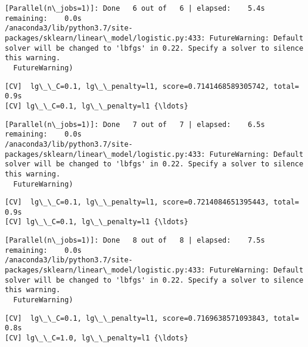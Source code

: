 \documentclass[11pt]{article}
\begin{document}
    \begin{Verbatim}[commandchars=\\\{\}]
[Parallel(n\_jobs=1)]: Done   6 out of   6 | elapsed:    5.4s remaining:    0.0s
/anaconda3/lib/python3.7/site-packages/sklearn/linear\_model/logistic.py:433: FutureWarning: Default solver will be changed to 'lbfgs' in 0.22. Specify a solver to silence this warning.
  FutureWarning)

    \end{Verbatim}

    \begin{Verbatim}[commandchars=\\\{\}]
[CV]  lg\_\_C=0.1, lg\_\_penalty=l1, score=0.7141468589305742, total=   0.9s
[CV] lg\_\_C=0.1, lg\_\_penalty=l1 {\ldots}

    \end{Verbatim}

    \begin{Verbatim}[commandchars=\\\{\}]
[Parallel(n\_jobs=1)]: Done   7 out of   7 | elapsed:    6.5s remaining:    0.0s
/anaconda3/lib/python3.7/site-packages/sklearn/linear\_model/logistic.py:433: FutureWarning: Default solver will be changed to 'lbfgs' in 0.22. Specify a solver to silence this warning.
  FutureWarning)

    \end{Verbatim}

    \begin{Verbatim}[commandchars=\\\{\}]
[CV]  lg\_\_C=0.1, lg\_\_penalty=l1, score=0.7214084651395443, total=   0.9s
[CV] lg\_\_C=0.1, lg\_\_penalty=l1 {\ldots}

    \end{Verbatim}

    \begin{Verbatim}[commandchars=\\\{\}]
[Parallel(n\_jobs=1)]: Done   8 out of   8 | elapsed:    7.5s remaining:    0.0s
/anaconda3/lib/python3.7/site-packages/sklearn/linear\_model/logistic.py:433: FutureWarning: Default solver will be changed to 'lbfgs' in 0.22. Specify a solver to silence this warning.
  FutureWarning)

    \end{Verbatim}

    \begin{Verbatim}[commandchars=\\\{\}]
[CV]  lg\_\_C=0.1, lg\_\_penalty=l1, score=0.7169638571093843, total=   0.8s
[CV] lg\_\_C=1.0, lg\_\_penalty=l1 {\ldots}

    \end{Verbatim}
\end{document}

